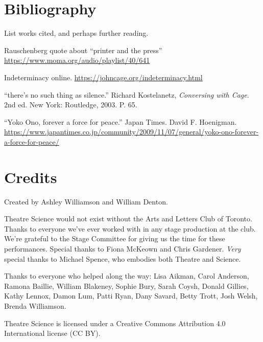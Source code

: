 

\newpage

\section{Bibliography}

List works cited, and perhaps further reading.

Rauschenberg quote about ``printer and the press'' \url{https://www.moma.org/audio/playlist/40/641}

Indeterminacy online.  \url{https://johncage.org/indeterminacy.html}

``there's no such thing as silence.''  Richard Kostelanetz, \textit{Conversing with Cage}.  2nd ed.  New York: Routledge, 2003.  P. 65.

``Yoko Ono, forever a force for peace.'' Japan Times.  David F. Hoenigman.  \url{https://www.japantimes.co.jp/community/2009/11/07/general/yoko-ono-forever-a-force-for-peace/}


\newpage

\section{Credits}

Created by Ashley Williamson and William Denton.

Theatre Science would not exist without the Arts and Letters Club of Toronto.  Thanks to everyone we've ever worked with in any stage production at the club.  We're grateful to the Stage Committee for giving us the time for these performances.  Special thanks to Fiona McKeown and Chris Gardener.  \textit{Very} special thanks to Michael Spence, who embodies both Theatre and Science.

Thanks to everyone who helped along the way:  Lisa Aikman, Carol Anderson, Ramona Baillie, William Blakeney, Sophie Bury, Sarah Coysh, Donald Gillies, Kathy Lennox, Damon Lum, Patti Ryan, Dany Savard, Betty Trott, Josh Welsh, Brenda Williamson.

Theatre Science is licensed under a Creative Commons Attribution 4.0 International license (CC BY).  %
